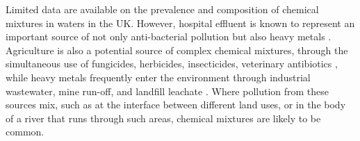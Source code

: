 \documentclass[final,1p,times]{elsarticle}
\begin{document}
Limited data are available on the prevalence and composition of chemical mixtures in waters in the UK. However, hospital effluent is known to represent an important source of not only anti-bacterial pollution \cite{Sacher2001} but also heavy metals \cite{Verlicchi2010}. Agriculture is also a potential source of complex chemical mixtures, through the simultaneous use of fungicides, herbicides, insecticides, veterinary antibiotics \cite{Stuart2012}, while heavy metals frequently enter the environment through industrial wastewater, mine run-off, and landfill leachate \cite{Facchinelli2001}. Where pollution from these sources mix, such as at the interface between different land uses, or in the body of a river that runs through such areas, chemical mixtures are likely to be common.

\end{document}
